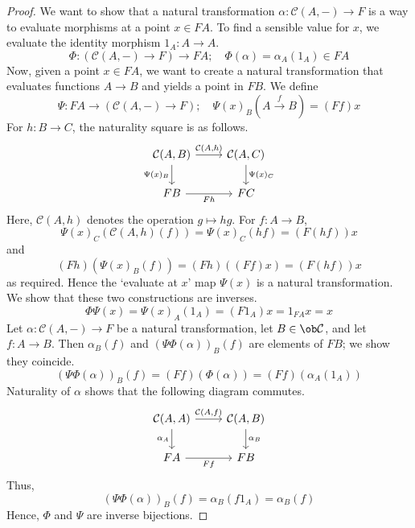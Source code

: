 \begin{proof}
    We want to show that a natural transformation \( \alpha : \mathcal C(A, -) \to F \) is a way to evaluate morphisms at a point \( x \in F A \).
    To find a sensible value for \( x \), we evaluate the identity morphism \( 1_A : A \to A \).
    \[ \Phi : (\mathcal C(A, -) \to F) \to F A;\quad \Phi(\alpha) = \alpha_A(1_A) \in F A \]
    Now, given a point \( x \in F A \), we want to create a natural transformation that evaluates functions \( A \to B \) and yields a point in \( F B \).
    We define
    \[ \Psi : F A \to (\mathcal C(A, -) \to F);\quad \Psi(x)_B(A \xrightarrow f B) = (F f)x \]
    For \( h : B \to C \), the naturality square is as follows.
    \[\begin{tikzcd}
        {\mathcal C(A, B)} & {\mathcal C(A, C)} \\
        FB & FC
        \arrow["{\mathcal C(A, h)}", from=1-1, to=1-2]
        \arrow["{\Psi(x)_C}", from=1-2, to=2-2]
        \arrow["{\Psi(x)_B}"', from=1-1, to=2-1]
        \arrow["Fh"', from=2-1, to=2-2]
    \end{tikzcd}\]
    Here, \( \mathcal C(A, h) \) denotes the operation \( g \mapsto hg \).
    For \( f : A \to B \),
    \[ \Psi(x)_C(\mathcal C(A, h)(f)) = \Psi(x)_C (hf) = (F (hf))x \]
    and
    \[ (Fh)(\Psi(x)_B(f)) = (Fh)((Ff)x) = (F (hf))x \]
    as required.
    Hence the `evaluate at \( x \)' map \( \Psi(x) \) is a natural transformation.
    We show that these two constructions are inverses.
    \[ \Phi \Psi(x) = \Psi(x)_A (1_A) = (F 1_A) x = 1_{F A} x = x \]
    Let \( \alpha : \mathcal C(A, -) \to F \) be a natural transformation, let \( B \in \ob \mathcal C \), and let \( f : A \to B \).
    Then \( \alpha_B(f) \) and \( (\Psi \Phi(\alpha))_B (f) \) are elements of \( F B \); we show they coincide.
    \[ (\Psi \Phi(\alpha))_B (f) = (F f) (\Phi(\alpha)) = (F f) (\alpha_A (1_A)) \]
    Naturality of \( \alpha \) shows that the following diagram commutes.
    \[\begin{tikzcd}
        {\mathcal C(A, A)} & {\mathcal C(A, B)} \\
        FA & FB
        \arrow["{\mathcal C(A, f)}", from=1-1, to=1-2]
        \arrow["{\alpha_B}", from=1-2, to=2-2]
        \arrow["{\alpha_A}"', from=1-1, to=2-1]
        \arrow["Ff"', from=2-1, to=2-2]
    \end{tikzcd}\]
    Thus,
    \[ (\Psi \Phi(\alpha))_B (f) = \alpha_B (f 1_A) = \alpha_B (f) \]
    Hence, \( \Phi \) and \( \Psi \) are inverse bijections.
\end{proof}
